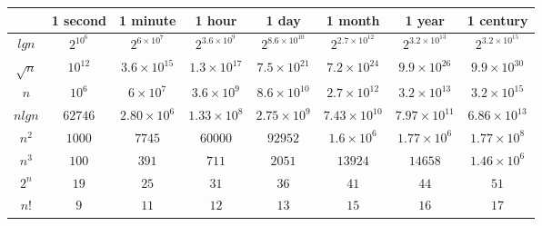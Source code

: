 \documentclass{article}
\begin{document}
\begin{center}
	\renewcommand{\arraystretch}{1.4}
	\begin{tabular}{c|c|c|c|c|c|c|c|}
		  & 1 second   & 1 minute		    & 1 hour 			  & 1 day 		           & 1 month 			    & 1 year 			     & 1 century             \\\hline
$lgn$	  & $2^{10^6}$ & $2^{6\times10^7}$  & $2^{3.6\times10^9}$ & $2^{8.6\times10^{10}}$ & $2^{2.7\times10^{12}}$ & $2^{3.2\times10^{13}}$ & $2^{3.2\times10^{15}}$\\\hline
$\sqrt{n}$& $10^{12}$  & $3.6\times10^{15}$ & $1.3\times10^{17}$  & $7.5\times10^{21}$     & $7.2\times10^{24}$     & $9.9\times10^{26}$     & $9.9\times10^{30}$    \\\hline
$n$		  & $10^6$     & $6\times10^7$ 	    & $3.6\times10^9$	  & $8.6\times10^{10}$	   & $2.7\times10^{12}$     & $3.2\times10^{13}$     & $3.2\times10^{15}$    \\\hline
$nlgn$	  & $62746$    & $2.80\times10^6$   & $1.33\times10^8$    & $2.75\times10^9$       & $7.43\times10^{10}$    & $7.97\times10^{11}$    & $6.86\times10^{13}$   \\\hline
$n^2$	  & $1000$     & $7745$		        & $60000$			  & $92952$			       & $1.6\times10^6$	    & $1.77\times10^6$	     & $1.77\times10^8$	     \\\hline
$n^3$	  & $100$	   & $391$			    & $711$			      & $2051$			       & $13924$		        & $14658$			     & $1.46\times10^6$	     \\\hline
$2^n$	  & $19$	   & $25$			    & $31$				  & $36$			       & $41$				    & $44$				     & $51$				     \\\hline
$n!$	  & $9$	       & $11$			    & $12$				  & $13$			       & $15$				    & $16$				     & $17$				     \\\hline
	\end{tabular}
\end{center}
\end{document}
